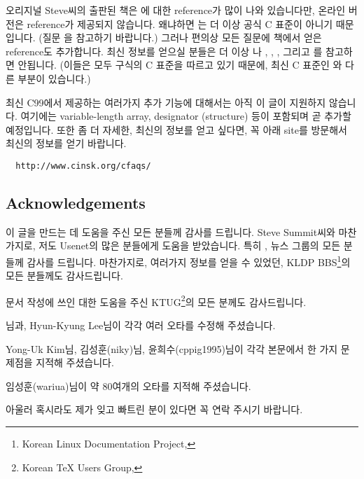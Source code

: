 오리지널 Steve씨의 출판된 책은 \cite{ansi}에 대한 reference가 많이 나와
있습니다만, 온라인 버전은 \cite{ansi} reference가 제공되지 않습니다. 왜냐하면
\cite{ansi}는 더 이상 공식 C 표준이 아니기 때문입니다. (질문 을
참고하기 바랍니다.) 그러나 편의상 모든
질문에 책에서 얻은 \cite{ansi} reference도 추가합니다. 최신 정보를 얻으실
분들은 더 이상 \cite{ansi}나 \cite{c89}, \cite{c9x}, \cite{rationale}, 그리고
\cite{hs}를 참고하면 안됩니다. (이들은 모두 구식의 C 표준을 따르고 있기 때문에,
최신 C 표준인 \cite{c99}와 다른 부분이 있습니다.)

최신 C99에서 제공하는 여러가지 추가 기능에 대해서는 아직 이 글이 지원하지
않습니다. 여기에는 variable-length array, designator (structure) 등이 포함되며
곧 추가할 예정입니다. 또한 좀 더 자세한, 최신의 정보를 얻고 싶다면,
꼭 아래 site를 방문해서 최신의 정보를 얻기 바랍니다.

\begin{verbatim}
  http://www.cinsk.org/cfaqs/
\end{verbatim}



\subsection*{Acknowledgements}

이 글을 만드는 데 도움을 주신 모든 분들께 감사를 드립니다.
Steve Summit씨와 마찬가지로, 저도 Usenet의 많은 분들에게 도움을 받았습니다.
특히 ,  뉴스 그룹의 모든 분들께
감사를 드립니다. 마찬가지로, 여러가지 정보를 얻을 수 있었던, 
KLDP BBS\footnote{Korean Linux Documentation Project, 
}의 모든 분들께도 감사드립니다.

문서 작성에 쓰인  대한 도움을 주신 
KTUG\footnote{Korean TeX Users Group, }의
모든 분께도 감사드립니다.

님과, Hyun-Kyung Lee님이 
각각 여러 오타를 수정해 주셨습니다.

Yong-Uk Kim님, 김성훈(niky)님, 윤희수(cppig1995)님이 각각 본문에서 한 가지
문제점을 지적해 주셨습니다.

임성훈(wariua)님이 약 80여개의 오타를 지적해 주셨습니다.

아울러 혹시라도
제가 잊고 빠트린 분이 있다면 꼭 연락 주시기 바랍니다.

%
%
